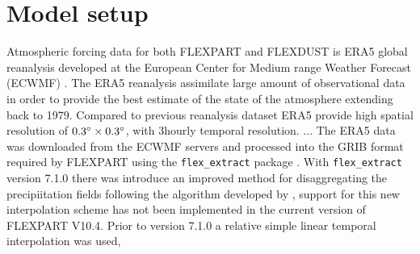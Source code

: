\section{Model setup}

Atmospheric forcing data for both FLEXPART and FLEXDUST is ERA5 global reanalysis developed at the European Center for Medium range Weather Forecast (ECWMF) \parencite{hersbach_era5_2020}. The ERA5 reanalysis assimilate large amount of observational data in order to provide the best estimate of the state of the atmosphere extending back to 1979. Compared to previous reanalysis dataset ERA5 provide high spatial resolution of $0.3\degree \times 0.3\degree$, with 3hourly temporal resolution. ... The ERA5 data was downloaded from the ECWMF servers and processed into the GRIB format required by FLEXPART using the \verb|flex_extract| package \parencite{tipka_flex_extract_2020}. With \verb|flex_extract| version 7.1.0 there was introduce an improved method for disaggregating the precipiitation fields following the algorithm developed by \parencite{hittmeir_conservative_2018}, support for this new interpolation scheme has not been implemented in the current version of FLEXPART V10.4. Prior to version 7.1.0 a relative simple linear temporal interpolation was used,  